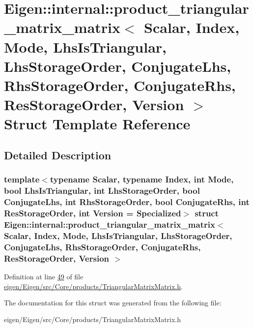 \hypertarget{struct_eigen_1_1internal_1_1product__triangular__matrix__matrix}{}\section{Eigen\+:\+:internal\+:\+:product\+\_\+triangular\+\_\+matrix\+\_\+matrix$<$ Scalar, Index, Mode, Lhs\+Is\+Triangular, Lhs\+Storage\+Order, Conjugate\+Lhs, Rhs\+Storage\+Order, Conjugate\+Rhs, Res\+Storage\+Order, Version $>$ Struct Template Reference}
\label{struct_eigen_1_1internal_1_1product__triangular__matrix__matrix}


\subsection{Detailed Description}
\subsubsection*{template$<$typename Scalar, typename Index, int Mode, bool Lhs\+Is\+Triangular, int Lhs\+Storage\+Order, bool Conjugate\+Lhs, int Rhs\+Storage\+Order, bool Conjugate\+Rhs, int Res\+Storage\+Order, int Version = Specialized$>$\newline
struct Eigen\+::internal\+::product\+\_\+triangular\+\_\+matrix\+\_\+matrix$<$ Scalar, Index, Mode, Lhs\+Is\+Triangular, Lhs\+Storage\+Order, Conjugate\+Lhs, Rhs\+Storage\+Order, Conjugate\+Rhs, Res\+Storage\+Order, Version $>$}



Definition at line \hyperlink{eigen_2_eigen_2src_2_core_2products_2_triangular_matrix_matrix_8h_source_l00049}{49} of file \hyperlink{eigen_2_eigen_2src_2_core_2products_2_triangular_matrix_matrix_8h_source}{eigen/\+Eigen/src/\+Core/products/\+Triangular\+Matrix\+Matrix.\+h}.



The documentation for this struct was generated from the following file\+:\begin{DoxyCompactItemize}
\item 
eigen/\+Eigen/src/\+Core/products/\+Triangular\+Matrix\+Matrix.\+h\end{DoxyCompactItemize}
